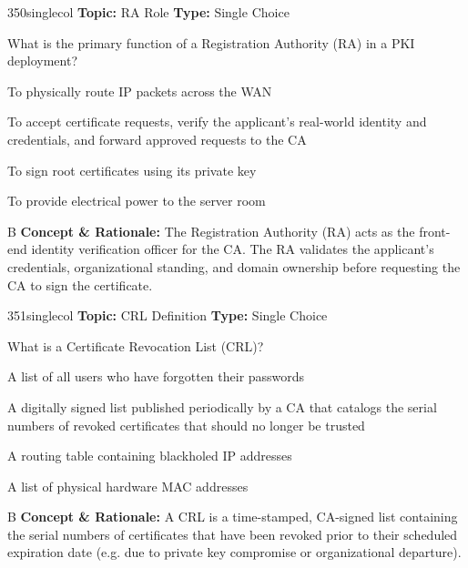 \begin{qcard}{350}{singlecol}
\textcolor{darkslate!75}{\small\textbf{Topic:} RA Role \hfill \textbf{Type:} Single Choice}\vspace{0.4em}\par
What is the primary function of a Registration Authority (RA) in a PKI deployment?
\begin{qoptions}
\item To physically route IP packets across the WAN
\item To accept certificate requests, verify the applicant's real-world identity and credentials, and forward approved requests to the CA
\item To sign root certificates using its private key
\item To provide electrical power to the server room
\end{qoptions}
\end{qcard}
\nopagebreak
\begin{explainbox}{B}
\textbf{Concept \& Rationale:} The Registration Authority (RA) acts as the front-end identity verification officer for the CA. The RA validates the applicant's credentials, organizational standing, and domain ownership before requesting the CA to sign the certificate.
\end{explainbox}

\begin{qcard}{351}{singlecol}
\textcolor{darkslate!75}{\small\textbf{Topic:} CRL Definition \hfill \textbf{Type:} Single Choice}\vspace{0.4em}\par
What is a Certificate Revocation List (CRL)?
\begin{qoptions}
\item A list of all users who have forgotten their passwords
\item A digitally signed list published periodically by a CA that catalogs the serial numbers of revoked certificates that should no longer be trusted
\item A routing table containing blackholed IP addresses
\item A list of physical hardware MAC addresses
\end{qoptions}
\end{qcard}
\nopagebreak
\begin{explainbox}{B}
\textbf{Concept \& Rationale:} A CRL is a time-stamped, CA-signed list containing the serial numbers of certificates that have been revoked prior to their scheduled expiration date (e.g. due to private key compromise or organizational departure).
\end{explainbox}

